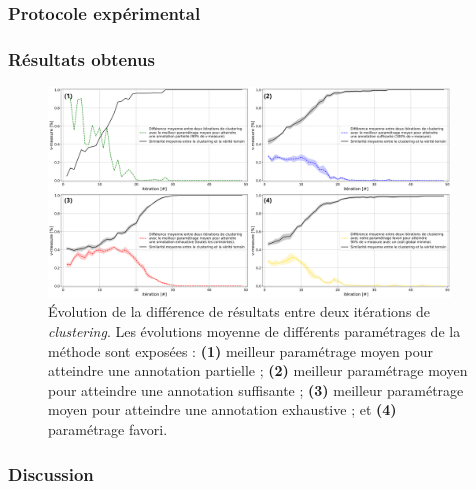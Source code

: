 		\subsubsection{Protocole expérimental}

		\subsubsection{Résultats obtenus}
		
			
			\begin{figure}[!htb]
				\centering
				\includegraphics[width=0.95\textwidth]{figures/etude-rentabilite-similarite-clustering}
				\caption{Évolution de la différence de résultats entre deux itérations de \textit{clustering}.
				Les évolutions moyenne de différents paramétrages de la méthode sont exposées :
				\textbf{(1)} meilleur paramétrage moyen pour atteindre une annotation partielle ;
				\textbf{(2)} meilleur paramétrage moyen pour atteindre une annotation suffisante ;
				\textbf{(3)} meilleur paramétrage moyen pour atteindre une annotation exhaustive ;
				et \textbf{(4)} paramétrage favori.
				}
				\label{figure:4.5.2-ETUDE-RENTABILITE-SIMILARITE-CLUSTERING}
			\end{figure}

		\subsubsection{Discussion}
		
			
